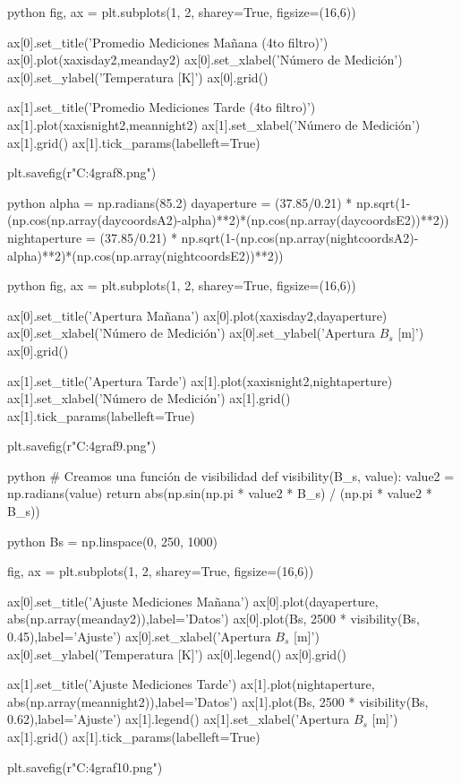 \begin{sourcecode}[\label{codigo-python}]{python}
fig, ax = plt.subplots(1, 2, sharey=True, figsize=(16,6))

ax[0].set_title('Promedio Mediciones Mañana (4to filtro)')
ax[0].plot(xaxisday2,meanday2)
ax[0].set_xlabel('Número de Medición')
ax[0].set_ylabel('Temperatura [K]')
ax[0].grid()

ax[1].set_title('Promedio Mediciones Tarde (4to filtro)')
ax[1].plot(xaxisnight2,meannight2)
ax[1].set_xlabel('Número de Medición')
ax[1].grid()
ax[1].tick_params(labelleft=True)

plt.savefig(r"C:\Users\Usuario\Downloads\inf4graf8.png")
\end{sourcecode}

\begin{sourcecode}[\label{codigo-python}]{python}
alpha = np.radians(85.2)
dayaperture = (37.85/0.21) * np.sqrt(1-(np.cos(np.array(daycoordsA2)-alpha)**2)*(np.cos(np.array(daycoordsE2))**2))
nightaperture = (37.85/0.21) * np.sqrt(1-(np.cos(np.array(nightcoordsA2)-alpha)**2)*(np.cos(np.array(nightcoordsE2))**2))
\end{sourcecode}

\begin{sourcecode}[\label{codigo-python}]{python}
fig, ax = plt.subplots(1, 2, sharey=True, figsize=(16,6))

ax[0].set_title('Apertura Mañana')
ax[0].plot(xaxisday2,dayaperture)
ax[0].set_xlabel('Número de Medición')
ax[0].set_ylabel('Apertura $B_s$ [m]')
ax[0].grid()

ax[1].set_title('Apertura Tarde')
ax[1].plot(xaxisnight2,nightaperture)
ax[1].set_xlabel('Número de Medición')
ax[1].grid()
ax[1].tick_params(labelleft=True)

plt.savefig(r"C:\Users\Usuario\Downloads\inf4graf9.png")
\end{sourcecode}

\begin{sourcecode}[\label{codigo-python}]{python}
# Creamos una función de visibilidad
def visibility(B_s, value):
    value2 = np.radians(value)
    return abs(np.sin(np.pi * value2 * B_s) / (np.pi * value2 * B_s))
\end{sourcecode}

\begin{sourcecode}[\label{codigo-python}]{python}
Bs = np.linspace(0, 250, 1000)

fig, ax = plt.subplots(1, 2, sharey=True, figsize=(16,6))

ax[0].set_title('Ajuste Mediciones Mañana')
ax[0].plot(dayaperture, abs(np.array(meanday2)),label='Datos')
ax[0].plot(Bs, 2500 * visibility(Bs, 0.45),label='Ajuste')
ax[0].set_xlabel('Apertura $B_s$ [m]')
ax[0].set_ylabel('Temperatura [K]')
ax[0].legend()
ax[0].grid()

ax[1].set_title('Ajuste Mediciones Tarde')
ax[1].plot(nightaperture, abs(np.array(meannight2)),label='Datos')
ax[1].plot(Bs, 2500 * visibility(Bs, 0.62),label='Ajuste')
ax[1].legend()
ax[1].set_xlabel('Apertura $B_s$ [m]')
ax[1].grid()
ax[1].tick_params(labelleft=True)

plt.savefig(r"C:\Users\Usuario\Downloads\inf4graf10.png")
\end{sourcecode}

